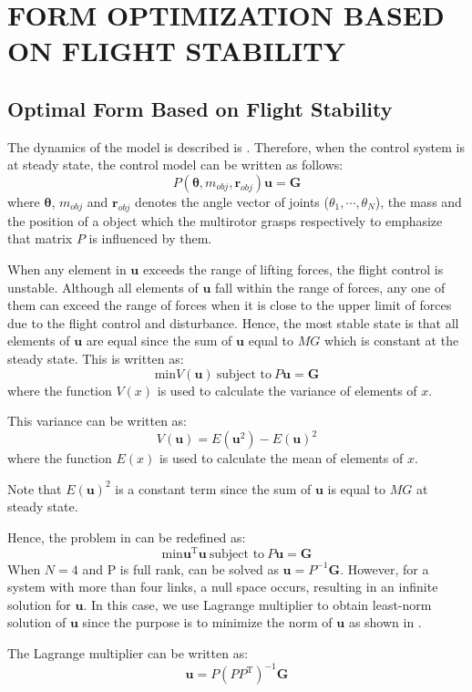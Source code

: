 \section{FORM OPTIMIZATION BASED ON FLIGHT STABILITY}
\subsection{Optimal Form Based on Flight Stability}
The dynamics of the model is described is . Therefore, when the control system is at steady state, the control model can be written as follows:
\begin{equation}
  P(\bm{\theta}, m_{obj}, \bm{r}_{obj})\bm{u}=\bm{G}
  \label{eq:steady_state}
\end{equation}
where $\bm{\theta}$, $m_{obj}$ and $\bm{r}_{obj}$ denotes the angle vector of joints ($\theta_1, \cdots, \theta_N$), the mass and the position of a object which the multirotor grasps respectively to emphasize that matrix $P$ is influenced by them.
\par
When any element in $\bm{u}$ exceeds the range of lifting forces, the flight control is unstable. Although all elements of $\bm{u}$ fall within the range of forces, any one of them can exceed the range of forces when it is close to the upper limit of forces due to the flight control and disturbance. Hence, the most stable state is that all elements of $\bm{u}$ are equal since the sum of $\bm{u}$ equal to $MG$ which is constant at the steady state. This is written as:
\begin{equation}
  \text{min} V(\bm{u}) \ \text{subject to} \ P\bm{u}=\bm{G}
  \label{eq:optimization}
\end{equation}
where the function $V(x)$ is used to calculate the variance of elements of $x$. 
\par
This variance can be written as:
\begin{equation}
  V(\bm{u})=E(\bm{u}^2)-E(\bm{u})^2
\end{equation}
where the function $E(x)$ is used to calculate the mean of elements of $x$. 
\par
Note that $E(\bm{u})^2$ is a constant term since the sum of $\bm{u}$ is equal to $MG$ at steady state.
\par
Hence, the problem in  can be redefined as:
\begin{equation}
  \text{min}\bm{u}^\mathrm{T}\bm{u} \ \text{subject to} \ P\bm{u}=\bm{G}
  \label{eq:optimization2}
\end{equation}
When $N=4$ and P is full rank,  can be solved as $\bm{u}=P^{-1}\bm{G}$. However, for a system with more than four links, a null space occurs, resulting in an infinite solution for $\bm{u}$. In this case, we use Lagrange multiplier to obtain least-norm solution of $\bm{u}$ since the purpose is to minimize the norm of $\bm{u}$ as shown in . 
\par
The Lagrange multiplier can be written as:
\begin{equation}
  \bm{u}=P(PP^\mathrm{T})^{-1}\bm{G}
  \label{eq:P_inv}
\end{equation}

